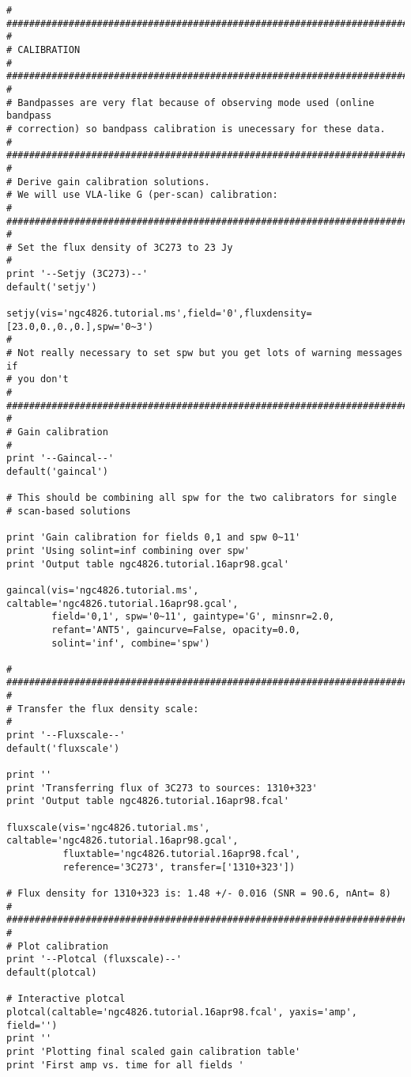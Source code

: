 \begin{verbatim}
#
##########################################################################
#
# CALIBRATION
#
##########################################################################
#
# Bandpasses are very flat because of observing mode used (online bandpass
# correction) so bandpass calibration is unecessary for these data.
#
##########################################################################
#
# Derive gain calibration solutions.
# We will use VLA-like G (per-scan) calibration:
#
##########################################################################
#
# Set the flux density of 3C273 to 23 Jy
#
print '--Setjy (3C273)--'
default('setjy')

setjy(vis='ngc4826.tutorial.ms',field='0',fluxdensity=[23.0,0.,0.,0.],spw='0~3')
#
# Not really necessary to set spw but you get lots of warning messages if
# you don't
#
##########################################################################
#
# Gain calibration
#
print '--Gaincal--'
default('gaincal')

# This should be combining all spw for the two calibrators for single
# scan-based solutions

print 'Gain calibration for fields 0,1 and spw 0~11'
print 'Using solint=inf combining over spw'
print 'Output table ngc4826.tutorial.16apr98.gcal'

gaincal(vis='ngc4826.tutorial.ms', caltable='ngc4826.tutorial.16apr98.gcal',
        field='0,1', spw='0~11', gaintype='G', minsnr=2.0,
        refant='ANT5', gaincurve=False, opacity=0.0,
        solint='inf', combine='spw')

#
##########################################################################
#
# Transfer the flux density scale:
#
print '--Fluxscale--'
default('fluxscale')

print ''
print 'Transferring flux of 3C273 to sources: 1310+323'
print 'Output table ngc4826.tutorial.16apr98.fcal'

fluxscale(vis='ngc4826.tutorial.ms', caltable='ngc4826.tutorial.16apr98.gcal',
          fluxtable='ngc4826.tutorial.16apr98.fcal',
          reference='3C273', transfer=['1310+323'])

# Flux density for 1310+323 is: 1.48 +/- 0.016 (SNR = 90.6, nAnt= 8)
#
##########################################################################
#
# Plot calibration
print '--Plotcal (fluxscale)--'
default(plotcal)

# Interactive plotcal
plotcal(caltable='ngc4826.tutorial.16apr98.fcal', yaxis='amp', field='')
print ''
print 'Plotting final scaled gain calibration table'
print 'First amp vs. time for all fields '
        

\end{verbatim}
